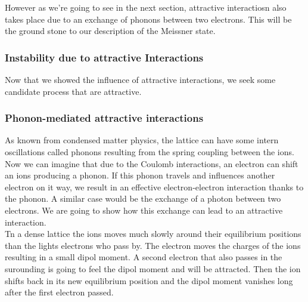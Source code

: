 \documentclass[../main.tex]{subfile}
\begin{document}
However as we're going to see in the next section, attractive interactiosn also takes place due to an exchange of phonons between two electrons. This will be the 
ground stone to our description of the Meissner state.

\subsubsection{Instability due to attractive Interactions}
Now that we showed the influence of attractive interactions, we seek some candidate process that are attractive.

\subsubsection{Phonon-mediated attractive interactions }
As known from condensed matter physics, the lattice can have some intern oscillations called phonons resulting from the spring coupling between the ions.
Now we can imagine that due to the Coulomb interactions, an electron can shift an ions producing a phonon. If this phonon travels and influences another electron
on it way, we result in an effective electron-electron interaction thanks to the phonon. A similar case would be the exchange of a photon between two electrons.
We are going to show how this exchange can lead to an attractive interaction.\\

Tn a dense lattice the ions moves much slowly around their equilibrium positions than the lights electrons who pass by. The electron moves the charges of the ions resulting
in a small dipol moment. A second electron that also passes in the surounding is going to feel the dipol moment and will be 
attracted. Then the ion shifts back in its new equilibrium position and the dipol moment vanishes long after the first electron passed.\\
\end{document}
